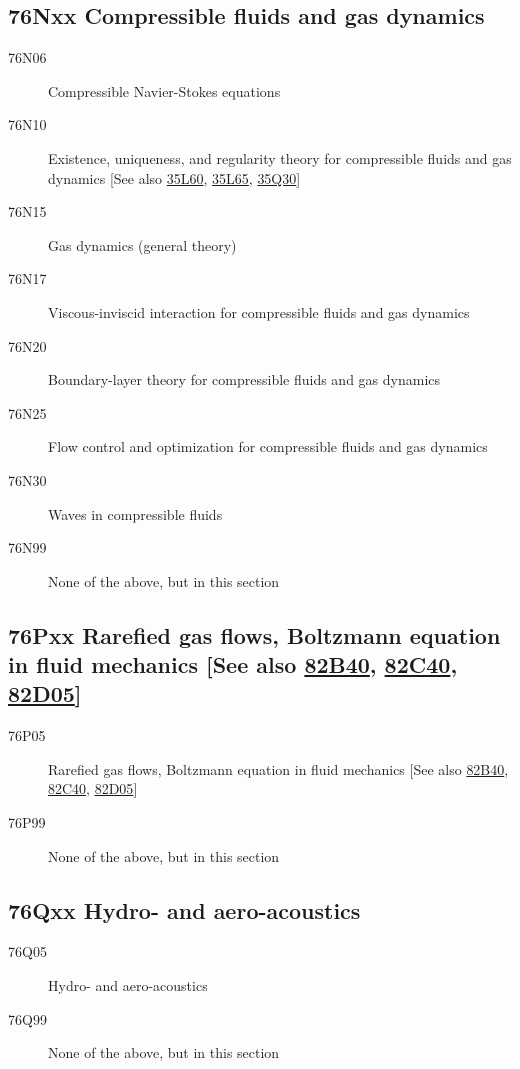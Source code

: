 \documentclass[letterpaper]{article}
\begin{document}
\subsection*{76Nxx  Compressible fluids and gas dynamics }\label{76Nxx}
\begin{description}  
\item [76N06]\label{76N06} Compressible Navier-Stokes equations
\item [76N10]\label{76N10} Existence, uniqueness, and regularity theory for compressible fluids and gas dynamics [See also \hyperref[35L60]{35L60}, \hyperref[35L65]{35L65}, \hyperref[35Q30]{35Q30}]
\item [76N15]\label{76N15} Gas dynamics (general theory)
\item [76N17]\label{76N17} Viscous-inviscid interaction for compressible fluids and gas dynamics
\item [76N20]\label{76N20} Boundary-layer theory for compressible fluids and gas dynamics
\item [76N25]\label{76N25} Flow control and optimization for compressible fluids and gas dynamics
\item [76N30]\label{76N30} Waves in compressible fluids
\item [76N99]\label{76N99} None of the above, but in this section
\end{description}
\subsection*{76Pxx  Rarefied gas flows, Boltzmann equation in fluid mechanics [See also \hyperref[82B40]{82B40}, \hyperref[82C40]{82C40}, \hyperref[82D05]{82D05}] }\label{76Pxx}
\begin{description}  
\item [76P05]\label{76P05} Rarefied gas flows, Boltzmann equation in fluid mechanics [See also \hyperref[82B40]{82B40}, \hyperref[82C40]{82C40}, \hyperref[82D05]{82D05}]
\item [76P99]\label{76P99} None of the above, but in this section
\end{description}
\subsection*{76Qxx  Hydro- and aero-acoustics }\label{76Qxx}
\begin{description}  
\item [76Q05]\label{76Q05} Hydro- and aero-acoustics
\item [76Q99]\label{76Q99} None of the above, but in this section
\end{description}
\end{document}
